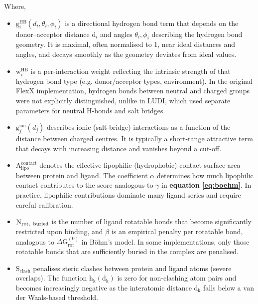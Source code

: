 \documentclass[12pt]{article}
\begin{document}
Where,
\begin{itemize}
  \item $\textrm{g}_i^{\textrm{HB}}(d_i, \theta_i, \phi_i)$ is a directional hydrogen bond term that depends on the donor--acceptor distance $\textrm{d}_i$ and angles $\theta_i, \phi_i$ describing the hydrogen bond geometry. It is maximal, often normalised to 1, near ideal distances and angles, and decays smoothly as the geometry deviates from ideal values.

  \item $\textrm{w}_i^{\textrm{HB}}$ is a per-interaction weight reflecting the intrinsic strength of that hydrogen bond type (e.g. donor/acceptor types, environment). In the original FlexX implementation, hydrogen bonds between neutral and charged groups were not explicitly distinguished, unlike in LUDI, which used separate parameters for neutral H-bonds and salt bridges\cite{CH7_bohm1994}.

  \item $\textrm{g}_j^{\textrm{ion}}(d_j)$ describes ionic (salt-bridge) interactions as a function of the distance between charged centres. It is typically a short-range attractive term that decays with increasing distance and vanishes beyond a cut-off.

  \item $\textrm{A}_{\textrm{lipo}}^{\textrm{contact}}$ denotes the effective lipophilic (hydrophobic) contact surface area between protein and ligand. The coefficient $\alpha$ determines how much lipophilic contact contributes to the score analogous to $\gamma$ in \textbf{equation \ref{eq:boehm}}. In practice, lipophilic contributions dominate many ligand series and require careful calibration\cite{CH7_bohm1994,CH7_stahl}.

  \item $\textrm{N}_{\textrm{rot,\, buried}}$ is the number of ligand rotatable bonds that become significantly restricted upon binding, and $\beta$ is an empirical penalty per rotatable bond, analogous to $\Delta \textrm{G}_{\textrm{rot}}^{(0)}$ in B{\"o}hm's model. In some implementations, only those rotatable bonds that are sufficiently buried in the complex are penalised.

  \item $\textrm{S}_{\textrm{clash}}$ penalises steric clashes between protein and ligand atoms (severe overlaps). The function $\textrm{h}_\textrm{k}(\textrm{d}_\textrm{k})$ is zero for non-clashing atom pairs and becomes increasingly negative as the interatomic distance $\textrm{d}_\textrm{k}$ falls below a van der Waals-based threshold.
\end{itemize}
\end{document}
